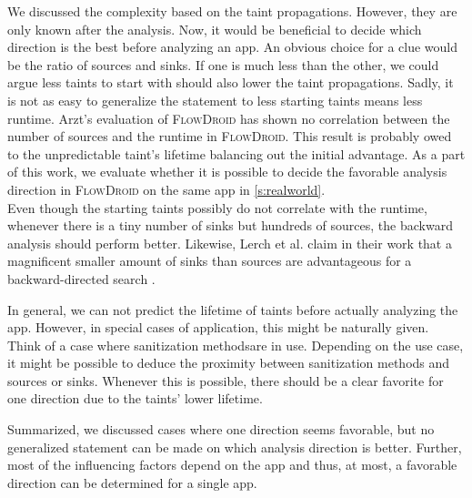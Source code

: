 \documentclass[../draft.tex]{subfiles}
\begin{document}
    We discussed the complexity based on the taint propagations. 
    However, they are only known after the analysis. 
    Now, it would be beneficial to decide which direction is the best before analyzing an app. 
    An obvious choice for a clue would be the ratio of sources and sinks. 
    If one is much less than the other, we could argue less taints to start with should also lower the taint propagations. 
    Sadly, it is not as easy to generalize the statement to less starting taints means less runtime. 
    Arzt's evaluation of \textsc{FlowDroid} has shown no correlation between the number of sources and the runtime in \textsc{FlowDroid}\cite{Arzt2017PhD}. 
    This result is probably owed to the unpredictable taint's lifetime balancing out the initial advantage.
    As a part of this work, we evaluate whether it is possible to decide the favorable analysis direction in \textsc{FlowDroid} on the same app in \autoref{s:realworld}.\\
    Even though the starting taints possibly do not correlate with the runtime, whenever there is a tiny number of sinks but hundreds of sources, the backward analysis should perform better.
    Likewise, Lerch et al. claim in their work that a magnificent smaller amount of sinks than sources are advantageous for a backward-directed search \cite{Lerch2014}.

    In general, we can not predict the lifetime of taints before actually analyzing the app. 
    However, in special cases of application, this might be naturally given. 
    Think of a case where sanitization methods\footnotemark are in use. 
    Depending on the use case, it might be possible to deduce the proximity between sanitization methods and sources or sinks.
    Whenever this is possible, there should be a clear favorite for one direction due to the taints' lower lifetime.

    Summarized, we discussed cases where one direction seems favorable, but no generalized statement can be made on which analysis direction is better. Further, most of the influencing factors depend on the app and thus, at most, a favorable direction can be determined for a single app.
\end{document}
